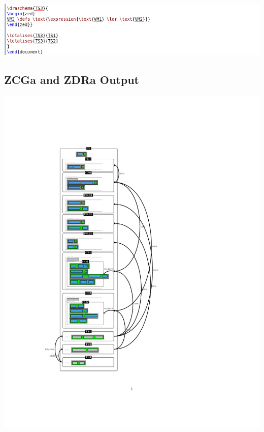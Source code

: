 \noindent \includegraphics[scale=0.5]{examples/vm/1n2imagec.png}

%
\subsection{ZCGa and ZDRa Output}
\label{app:vm1n2o}
\includegraphics[clip, trim=3cm 4cm 6cm 4.2cm]{examples/vm/1n2comp.pdf}
%
